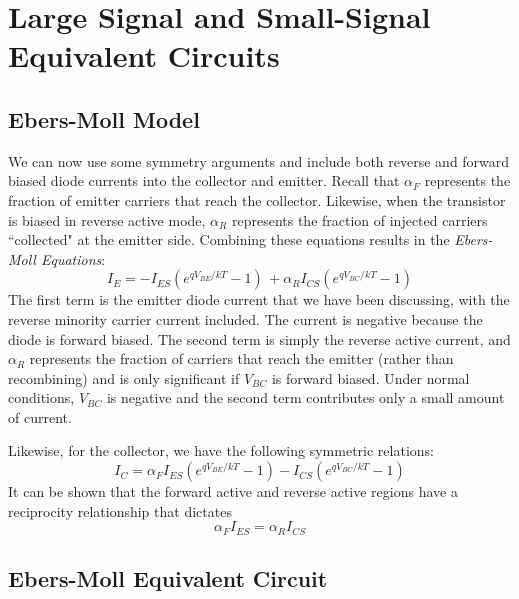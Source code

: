 \section{Large Signal and Small-Signal Equivalent Circuits}

\subsection{Ebers-Moll Model}
We can now use some symmetry arguments and include both reverse and forward biased diode currents into the collector and emitter.   Recall that $\alpha_F$ represents the fraction of emitter carriers that reach the collector.  Likewise, when the transistor is biased in reverse active mode, $\alpha_R$ represents the fraction of injected carriers ``collected" at the emitter side.  Combining these equations results in the \emph{Ebers-Moll Equations}:
%
\begin{equation}
	{I_E} =  - {I_{ES}}\left( {{e^{{qV_{BE}}/{kT}}} - 1} \right)\, + {\alpha _R}{I_{CS}}\left( {{e^{{qV_{BC}}/{kT}}} - 1} \right)
\end{equation}
%
The first term is the emitter diode current that we have been discussing, with the reverse minority carrier current included.  The current is negative because the diode is forward biased.  The second term is simply the reverse active current, and $\alpha_R$ represents the fraction of carriers that reach the emitter (rather than recombining) and is only significant if $V_{BC}$ is forward biased.  Under normal conditions, $V_{BC}$ is negative and the second term contributes only a small amount of current.  

Likewise, for the collector, we have the following symmetric relations:
%
\begin{equation}
	{I_C} = {\alpha _F}{I_{ES}}\left( {{e^{{qV_{BE}}/{kT}}} - 1} \right) - {I_{CS}}\left( {{e^{{qV_{BC}}/{kT}}} - 1} \right)
\end{equation}
%
It can be shown that the forward active and reverse active regions have a reciprocity relationship that dictates 
%
\begin{equation}
	{\alpha _F}{I_{ES}} = {\alpha _R}{I_{CS}}
\end{equation}





\subsection{Ebers-Moll Equivalent Circuit}

